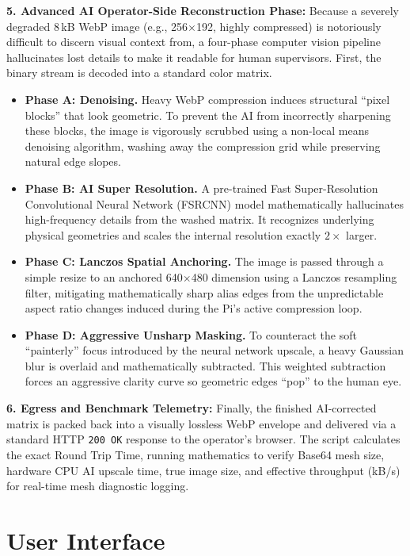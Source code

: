 \textbf{5. Advanced AI Operator-Side Reconstruction Phase:} Because a severely degraded 8\,kB WebP image (e.g., 256$\times$192, highly compressed) is notoriously difficult to discern visual context from, a four-phase computer vision pipeline hallucinates lost details to make it readable for human supervisors. First, the binary stream is decoded into a standard color matrix. 
\begin{itemize}
    \item \textbf{Phase A: Denoising.} Heavy WebP compression induces structural ``pixel blocks'' that look geometric. To prevent the AI from incorrectly sharpening these blocks, the image is vigorously scrubbed using a non-local means denoising algorithm, washing away the compression grid while preserving natural edge slopes.
    \item \textbf{Phase B: AI Super Resolution.} A pre-trained Fast Super-Resolution Convolutional Neural Network (FSRCNN) \cite{dong2016fsrcnn} model mathematically hallucinates high-frequency details from the washed matrix. It recognizes underlying physical geometries and scales the internal resolution exactly $2\times$ larger.
    \item \textbf{Phase C: Lanczos Spatial Anchoring.} The image is passed through a simple resize to an anchored 640$\times$480 dimension using a Lanczos resampling filter, mitigating mathematically sharp alias edges from the unpredictable aspect ratio changes induced during the Pi's active compression loop.
    \item \textbf{Phase D: Aggressive Unsharp Masking.} To counteract the soft ``painterly'' focus introduced by the neural network upscale, a heavy Gaussian blur is overlaid and mathematically subtracted. This weighted subtraction forces an aggressive clarity curve so geometric edges ``pop'' to the human eye.
\end{itemize}

\textbf{6. Egress and Benchmark Telemetry:} Finally, the finished AI-corrected matrix is packed back into a visually lossless WebP envelope and delivered via a standard HTTP \texttt{200 OK} response to the operator's browser. The script calculates the exact Round Trip Time, running mathematics to verify Base64 mesh size, hardware CPU AI upscale time, true image size, and effective throughput (kB/s) for real-time mesh diagnostic logging.


\section{User Interface}

